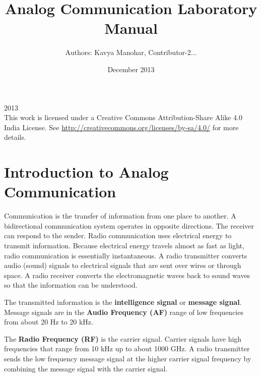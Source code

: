 \documentclass{book}
\begin{document}
\thispagestyle{empty}
\thispagestyle{empty}

\title{Analog Communication
Laboratory Manual}
\date{December 2013}
\author {Authors: Kavya Manohar, Contributor-2...}
\maketitle
  
\textcopyright{}2013
\\[5cm]
    This work is licensed under a Creative Commons Attribution-Share Alike 4.0 India License. See \url{http://creativecommons.org/licenses/by-sa/4.0/} for more details.






\thispagestyle{empty}
\tableofcontents
\thispagestyle{empty}
\thispagestyle{empty}

\listoffigures
\thispagestyle{empty}
\chapter [Introduction to Analog Communication]{Introduction to Analog Communication}


\cite{ACmanual}Communication is the transfer of information from one place to another. A bidirectional communication system operates in opposite directions. The receiver can respond
to the sender. Radio communication uses electrical energy to transmit information. Because electrical energy travels almost as fast as light, radio communication is essentially instantaneous.
A radio transmitter converts audio (sound) signals to electrical signals that are sent over wires or through space. A radio receiver converts the electromagnetic waves back to sound waves so that the
information can be understood. 

The transmitted information is the \textbf {intelligence signal} or \textbf{ message signal}.
 Message signals are in the \textbf {Audio Frequency (AF)} range of low frequencies from about 20 Hz to 20 kHz.
 
 
The \textbf{Radio Frequency (RF)}  is the carrier signal. Carrier signals have high frequencies that range from 10 kHz up to about 1000 GHz.
A radio transmitter sends the low frequency message signal at the higher carrier signal frequency by combining the message signal with the carrier signal.
\end{document}
